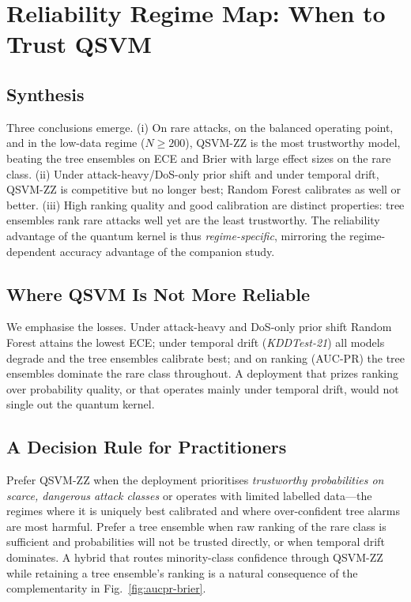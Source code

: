 \documentclass[journal]{IEEEtran}
\newcommand{\ZZ}{\textsc{ZZ}}
\newcommand{\QSVM}{QSVM-\ZZ}
\begin{document}
\section{Reliability Regime Map: When to Trust QSVM}\label{sec:regime}

\subsection{Synthesis}
Three conclusions emerge. (i) On rare attacks, on the balanced operating
point, and in the low-data regime ($N\!\ge\!200$), \QSVM{} is the most
trustworthy model, beating the tree ensembles on ECE and Brier with large
effect sizes on the rare class. (ii) Under attack-heavy/DoS-only prior
shift and under temporal drift, \QSVM{} is competitive but no longer best;
Random Forest calibrates as well or better. (iii) High ranking quality
and good calibration are distinct properties: tree ensembles rank rare
attacks well yet are the least trustworthy. The reliability advantage of
the quantum kernel is thus \emph{regime-specific}, mirroring the
regime-dependent accuracy advantage of the companion study.

\subsection{Where QSVM Is Not More Reliable}
We emphasise the losses. Under attack-heavy and DoS-only prior shift
Random Forest attains the lowest ECE; under temporal drift
(\textit{KDDTest-21}) all models degrade and the tree ensembles calibrate
best; and on ranking (AUC-PR) the tree ensembles dominate the rare class
throughout. A deployment that prizes ranking over probability quality, or
that operates mainly under temporal drift, would not single out the
quantum kernel.

\subsection{A Decision Rule for Practitioners}
Prefer \QSVM{} when the deployment prioritises \emph{trustworthy
probabilities on scarce, dangerous attack classes} or operates with
limited labelled data---the regimes where it is uniquely best calibrated
and where over-confident tree alarms are most harmful. Prefer a tree
ensemble when raw ranking of the rare class is sufficient and
probabilities will not be trusted directly, or when temporal drift
dominates. A hybrid that routes minority-class confidence through
\QSVM{} while retaining a tree ensemble's ranking is a natural
consequence of the complementarity in Fig.~\ref{fig:aucpr-brier}.
\end{document}
